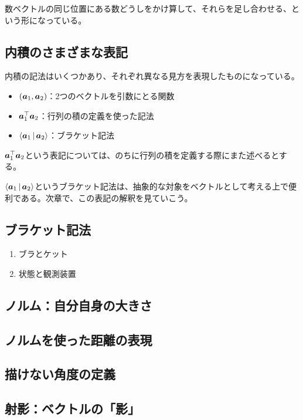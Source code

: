 \documentclass[../../imaging-math]{subfiles}
\begin{document}
数ベクトルの同じ位置にある数どうしをかけ算して、それらを足し合わせる、という形になっている。

\subsection{内積のさまざまな表記}

内積の記法はいくつかあり、それぞれ異なる見方を表現したものになっている。

\begin{itemize}
  \item $(\vb*{a}_1, \vb*{a}_2)$：2つのベクトルを引数にとる関数
  \item $\vb*{a}_1^\top \vb*{a}_2$：行列の積の定義を使った記法
  \item $\Braket{\vb*{a}_1 | \vb*{a}_2}$：ブラケット記法
\end{itemize}

$\vb*{a}_1^\top \vb*{a}_2$という表記については、のちに行列の積を定義する際にまた述べるとする。

$\Braket{\vb*{a}_1 | \vb*{a}_2}$というブラケット記法は、抽象的な対象をベクトルとして考える上で便利である。次章で、この表記の解釈を見ていこう。

\subsection{ブラケット記法}

\begin{mindflow}
  \begin{enumerate}
    \item ブラとケット
    \item 状態と観測装置
  \end{enumerate}
\end{mindflow}

\subsection{ノルム：自分自身の大きさ}

\subsection{ノルムを使った距離の表現}

\subsection{描けない角度の定義}

\subsection{射影：ベクトルの「影」}
\end{document}
